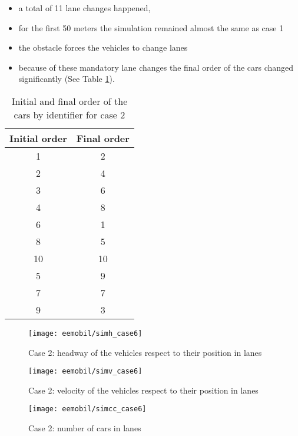 			\begin{itemize}
				\item a total of 11 lane changes happened,
				\item for the first 50 meters the simulation remained almost the same as case 1
				\item the obstacle forces the vehicles to change lanes
				\item because of these mandatory lane changes the final order of the cars changed significantly (See Table \ref{tab:car_order_case_2}).
			\end{itemize}
			\begin{table}
				\begin{center}
					\begin{tabular}{ |c|c| }
						\hline
						Initial order & Final order \\
						\hline
						1 & 2\\
						2 & 4\\
						3 & 6\\
						4 & 8\\
						6 & 1\\
						8 & 5\\
						10 & 10\\
						5 & 9\\
						7 & 7\\
						9 & 3\\
						\hline
					\end{tabular}
				\end{center}
				\caption{Initial and final order of the cars by identifier for case 2}
				\label{tab:car_order_case_2}
			\end{table}
			\begin{figure}
				\centering
				\texttt{[image: eemobil/simh\_case6]}
				\caption{Case 2: headway of the vehicles respect to their position in lanes}
				\label{fig:red_light_situationh3}
			\end{figure}
			\begin{figure}
				\centering
				\texttt{[image: eemobil/simv\_case6]}
				\caption{Case 2: velocity of the vehicles respect to their position in lanes}
				\label{fig:red_light_situationv3}
			\end{figure}
			\begin{figure}
				\centering
				\texttt{[image: eemobil/simcc\_case6]}
				\caption{Case 2: number of cars in lanes}
				\label{fig:red_light_situationcc3}
			\end{figure}